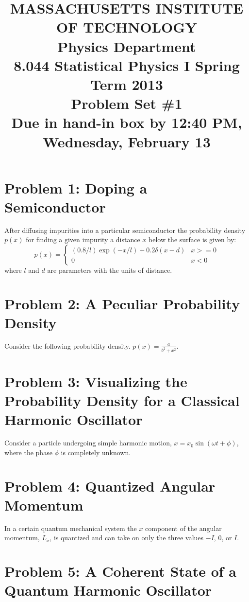 \documentclass[12pt]{article}
\begin{document}
\title{MASSACHUSETTS INSTITUTE OF TECHNOLOGY \\
Physics Department \\
8.044 Statistical Physics I Spring Term 2013 \\
Problem Set \#1 \\
Due in hand-in box by 12:40 PM, Wednesday, February 13}
\date{}
\maketitle
\section*{Problem 1: Doping a Semiconductor}
After diffusing impurities into a particular semiconductor the probability density $p(x)$ for finding a given impurity a distance $x$ below the surface is given by:
\[
p(x) = 
\begin{cases} 
(0.8/l) \exp(-x/l) + 0.2 \delta(x - d) & x>= 0 \\
0 & x< 0 
\end{cases}
\]
where $l$ and $d$ are parameters with the units of distance. 

\section*{Problem 2: A Peculiar Probability Density} 

Consider the following probability density. 
$p(x) = \frac{a}{b^2 + x^2}.$ 

\section*{Problem 3: Visualizing the Probability Density for a Classical Harmonic Oscillator}

Consider a particle undergoing simple harmonic motion, $x = x_0 \sin(\omega t + \phi)$, where the phase $\phi$ is completely unknown.

\section*{Problem 4: Quantized Angular Momentum}

In a certain quantum mechanical system the $x$ component of the angular momentum, $L_x$, is quantized and can take on only the three values $-I$, $0$, or $I$. 

\section*{Problem 5: A Coherent State of a Quantum Harmonic Oscillator}
\end{document}
